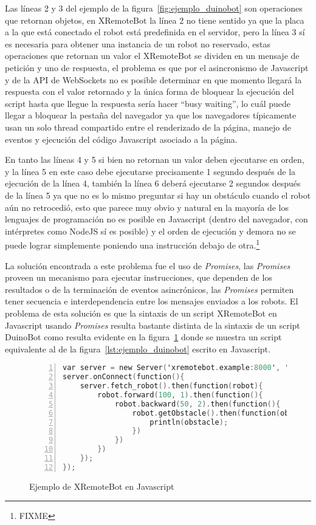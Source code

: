 Las líneas 2 y 3 del ejemplo de la figura~\ref{fig:ejemplo_duinobot} son
operaciones que retornan objetos, en XRemoteBot la línea 2 no tiene sentido
ya que la placa a la que está conectado el robot está predefinida en el
servidor, pero la línea 3 sí es necesaria para obtener una instancia de un
robot no reservado, estas operaciones que retornan un valor el XRemoteBot
se dividen en un mensaje de petición y uno de respuesta, el problema
es que por el asincronismo de Javascript y de la API de WebSockets no
es posible determinar en que momento llegará la respuesta con el valor
retornado y la única forma de bloquear la ejecución del script hasta que
llegue la respuesta sería hacer ``busy waiting'', lo cuál puede llegar a
bloquear la pestaña del navegador ya que los navegadores típicamente usan
un solo thread compartido entre el renderizado de la página, manejo de
eventos y ejecución del código Javascript asociado a la página.

En tanto las líneas 4 y 5 si bien no retornan un valor deben ejecutarse
en orden, y la línea 5 en este caso debe ejecutarse precisamente 1 segundo
después de la ejecución de la línea 4, también la línea 6 deberá ejecutarse
2 segundos después de la línea 5 ya que no es lo mismo preguntar si hay
un obstáculo cuando el robot aún no retrocedió, esto que parece muy obvio
y natural en la mayoría de los lenguajes de programación no es posible
en Javascript (dentro del navegador, con intérpretes como NodeJS sí es
posible) y el orden de ejecución y demora no se puede lograr simplemente
poniendo una instrucción debajo de otra.\footnote{FIXME}


La solución encontrada a este problema fue el uso de
\textit{Promises}\cite{FIXME},
las \textit{Promises} proveen un mecanismo para ejecutar instrucciones,
que dependen de los resultados o de la terminación de eventos asincrónicos,
las \textit{Promises} permiten tener secuencia e interdependencia entre los
mensajes enviados a los robots.
El problema de esta solución es que la sintaxis de un script XRemoteBot en
Javascript usando \textit{Promises}
resulta bastante distinta de la sintaxis de un script DuinoBot como resulta
evidente
en la figura~\ref{lst:ejemplo_xremotebot_javascript} donde se muestra un
script equivalente
al de la figura~\ref{lst:ejemplo_duinobot} escrito en Javascript.

\begin{figure}
    \begin{lstlisting}[language=C,numbers=left]
var server = new Server('xremotebot.example:8000', 'api-key');
server.onConnect(function(){
    server.fetch_robot().then(function(robot){
        robot.forward(100, 1).then(function(){
            robot.backward(50, 2).then(function(){
                robot.getObstacle().then(function(obstacle){
                    println(obstacle);
                })
            })
        })
    });
});
    \end{lstlisting}
    \caption{Ejemplo de XRemoteBot en Javascript}
    \label{lst:ejemplo_xremotebot_javascript}
\end{figure}

